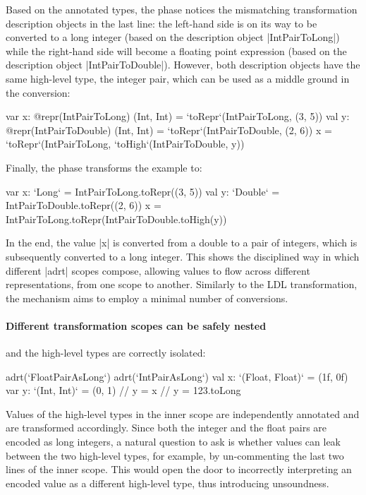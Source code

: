 Based on the annotated types, the \coerce{} phase notices the mismatching transformation description objects in the last line: the left-hand side is on its way to be converted to a long integer (based on the description object |IntPairToLong|) while the right-hand side will become a floating point expression (based on the description object |IntPairToDouble|). However, both description objects have the same high-level type, the integer pair, which can be used as a middle ground in the conversion:

\begin{lstlisting-nobreak}
var x: @repr(IntPairToLong) (Int, Int) = `toRepr`(IntPairToLong, (3, 5))
val y: @repr(IntPairToDouble) (Int, Int) = `toRepr`(IntPairToDouble, (2, 6))
x = `toRepr`(IntPairToLong, `toHigh`(IntPairToDouble, y))
\end{lstlisting-nobreak}

Finally, the \commit{} phase transforms the example to:

\begin{lstlisting-nobreak}
var x: `Long` = IntPairToLong.toRepr((3, 5))
val y: `Double` = IntPairToDouble.toRepr((2, 6))
x = IntPairToLong.toRepr(IntPairToDouble.toHigh(y))
\end{lstlisting-nobreak}

In the end, the value |x| is converted from a double to a pair of integers, which is subsequently converted to a long integer. This shows the disciplined way in which different |adrt| scopes compose, allowing values to flow across different representations, from one scope to another. Similarly to the LDL transformation, the mechanism aims to employ a minimal number of conversions.



\paragraph*{Different transformation scopes can be safely nested} and the high-level types are correctly isolated:

\begin{lstlisting-nobreak}
adrt(`FloatPairAsLong`) {
  adrt(`IntPairAsLong`) {
    val x: `(Float, Float)` = (1f, 0f)
    var y: `(Int, Int)` = (0, 1)
    // y = x
    // y = 123.toLong
  }
}
\end{lstlisting-nobreak}

Values of the high-level types in the inner scope are independently annotated and are transformed accordingly. Since both the integer and the float pairs are encoded as long integers, a natural question to ask is whether values can leak between the two high-level types, for example, by un-commenting the last two lines of the inner scope. This would open the door to incorrectly interpreting an encoded value as a different high-level type, thus introducing unsoundness.

